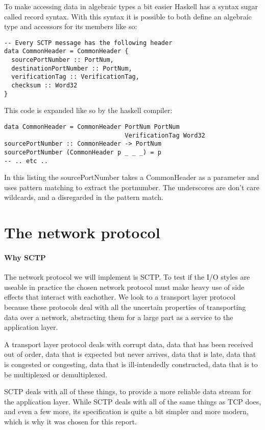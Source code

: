 To make accessing data in algebraic types a bit easier Haskell has a syntax sugar called record syntax. With this syntax it is possible to both define an algebraic type and accessors for its members like so:
\begin{lstlisting}[caption={SCTP Common Header}]
-- Every SCTP message has the following header
data CommonHeader = CommonHeader {
  sourcePortNumber :: PortNum,
  destinationPortNumber :: PortNum,
  verificationTag :: VerificationTag,
  checksum :: Word32
}
\end{lstlisting}

This code is expanded like so by the haskell compiler:

\begin{lstlisting}[caption={SCTP Common Header}]
data CommonHeader = CommonHeader PortNum PortNum
                                 VerificationTag Word32
sourcePortNumber :: CommonHeader -> PortNum
sourcePortNumber (CommonHeader p _ _ _) = p
-- .. etc ..
\end{lstlisting}

In this listing the sourcePortNumber takes a CommonHeader as a parameter and uses pattern matching to extract the portnumber. The underscores are don't care wildcards, and a disregarded in the pattern match.


\section{The network protocol}
\paragraph{Why SCTP}
The network protocol we will implement is SCTP.
To test if the I/O styles are useable in practice the chosen network protocol must make heavy use of side effects that interact with eachother.
We look to a transport layer protocol because these protocols deal with all the uncertain properties of transporting data over a network, abstracting them for a large part as a service to the application layer.

A transport layer protocol deals with corrupt data, data that has been received out of order, data that is expected but never arrives, data that is late, data that is congested or congesting, data that is ill-intendedly constructed, data that is to be multiplexed or demultiplexed.

SCTP deals with all of these things, to provide a more reliable data stream for the application layer.
While SCTP deals with all of the same things as TCP does, and even a few more, its specification is quite a bit simpler and more modern, which is why it was chosen for this report.
